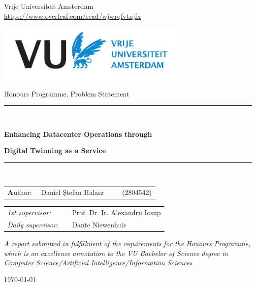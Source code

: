 \thispagestyle{empty}
\begin{center}
    \vspace*{0.7cm}

    Vrije Universiteit Amsterdam \\
    \url{https://www.overleaf.com/read/wjwrqfvtnjfx}

    {\includegraphics[height=28mm]{style/vu-griffioen-white}}
    \vspace{1cm}

    {\Large Honours Programme, Problem Statement}
    \vspace{1cm}

    \rule{.9\linewidth}{.6pt}\\[0.4cm]
    {
        \huge \bfseries Enhancing Datacenter Operations through\par
    }
    \vspace{-0.2cm}
    {
        \huge \bfseries Digital Twinning as a Service\par
    }
    \rule{.9\linewidth}{.6pt}\\[2.5cm]

    {
        \Large
        \begin{tabular}{l}
        {\textbf Author:}
            ~~Daniel Ștefan Halasz ~~~~ (2804542)
        \end{tabular}
    }

    \begin{tabular}{ll}
        \textit{1st supervisor:}
        & ~~Prof. Dr. Ir. Alexandru Iosup \\
        \textit{Daily supervisor:} & ~~Dante Niewenhuis~~~~          \\
    \end{tabular}
    \vspace{2.8cm}

    \textit{A report submitted in fulfillment of the requirements for the Honours Programme,\\
    which is an excellence annotation to the VU Bachelor of Science degree in\\
    Computer Science/Artificial Intelligence/Information Sciences}

    \today\\[4cm]
\end{center}
